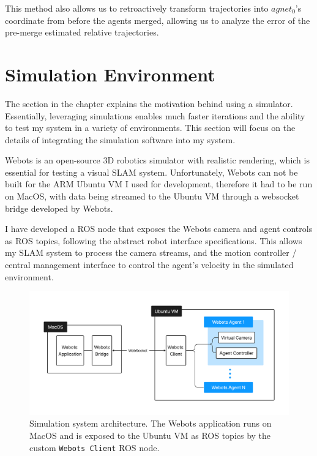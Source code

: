 This method also allows us to retroactively transform trajectories into $agnet_0$'s coordinate from before the agents merged, allowing us to analyze the error of the pre-merge estimated relative trajectories.

\section{Simulation Environment}
\label{sec:simulation-environment}
The  section in the  chapter explains the motivation behind using a simulator. Essentially, leveraging simulations enables much faster iterations and the ability to test my system in a variety of environments. This section will focus on the details of integrating the simulation software into my system.

Webots is an open-source 3D robotics simulator with realistic rendering, which is essential for testing a visual SLAM system. Unfortunately, Webots can not be built for the ARM Ubuntu VM I used for development, therefore it had to be run on MacOS, with data being streamed to the Ubuntu VM through a websocket bridge developed by Webots.

I have developed a ROS node that exposes the Webots camera and agent controls as ROS topics, following the abstract robot interface specifications. This allows my SLAM system to process the camera streams, and the motion controller / central management interface to control the agent's velocity in the simulated environment.


\begin{figure}[h]
    \centering
    \includegraphics[trim=5cm 5cm 5cm 5cm, scale=0.18]{figures/simulation_environment.pdf}

    \caption{Simulation system architecture. The Webots application runs on MacOS and is exposed to the Ubuntu VM as ROS topics by the custom \texttt{Webots Client} ROS node.}
    \label{fig:simulation-environment}
\end{figure}


